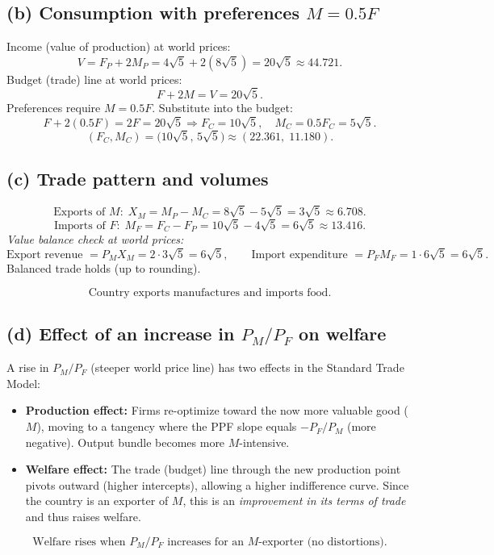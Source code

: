 \documentclass[12pt]{article}
\begin{document}
\subsection*{(b) Consumption with preferences $M = 0.5F$}
Income (value of production) at world prices:
\[
V = F_P + 2M_P = 4\sqrt{5} + 2(8\sqrt{5}) = 20\sqrt{5} \approx 44.721.
\]
Budget (trade) line at world prices:
\[
F + 2M = V = 20\sqrt{5}.
\]
Preferences require $M = 0.5F$. Substitute into the budget:
\[
F + 2(0.5F) = 2F = 20\sqrt{5} \Rightarrow F_C = 10\sqrt{5}, \quad M_C = 0.5F_C = 5\sqrt{5}.
\]
\[
\boxed{(F_C, M_C) = \big(10\sqrt{5},\, 5\sqrt{5}\big) \approx (22.361,\; 11.180).}
\]

\subsection*{(c) Trade pattern and volumes}
\[
\text{Exports of } M: \; X_M = M_P - M_C = 8\sqrt{5} - 5\sqrt{5} = 3\sqrt{5} \approx 6.708.
\]
\[
\text{Imports of } F: \; M_F = F_C - F_P = 10\sqrt{5} - 4\sqrt{5} = 6\sqrt{5} \approx 13.416.
\]
\textit{Value balance check at world prices:}
\[
\text{Export revenue }= P_M X_M = 2 \cdot 3\sqrt{5} = 6\sqrt{5}, \qquad
\text{Import expenditure }= P_F M_F = 1 \cdot 6\sqrt{5} = 6\sqrt{5}.
\]
Balanced trade holds (up to rounding).

\[
\boxed{\text{Country exports manufactures and imports food.}}
\]

\subsection*{(d) Effect of an increase in $P_M/P_F$ on welfare}
A rise in $P_M/P_F$ (steeper world price line) has two effects in the Standard Trade Model:
\begin{itemize}
\item \textbf{Production effect:} Firms re-optimize toward the now more valuable good ($M$), moving to a tangency where the PPF slope equals $-P_F/P_M$ (more negative). Output bundle becomes more $M$-intensive.
\item \textbf{Welfare effect:} The trade (budget) line through the new production point pivots outward (higher intercepts), allowing a higher indifference curve. Since the country is an exporter of $M$, this is an \emph{improvement in its terms of trade} and thus raises welfare.
\end{itemize}
\[
\boxed{\text{Welfare rises when } P_M/P_F \text{ increases for an } M\text{-exporter (no distortions).}}
\]
\end{document}
